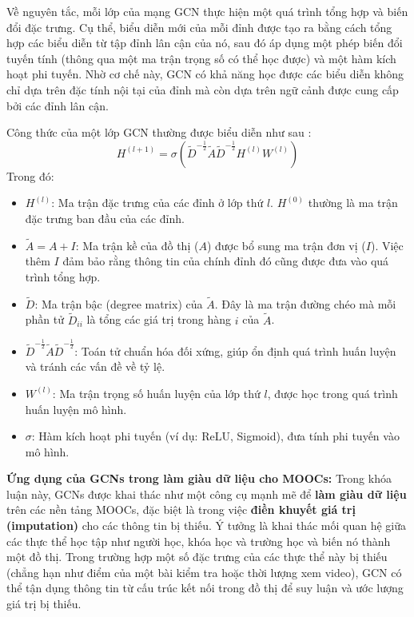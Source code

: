 Về nguyên tắc, mỗi lớp của mạng GCN thực hiện một quá trình tổng hợp và biến đổi đặc trưng. Cụ thể, biểu diễn mới của mỗi đỉnh được tạo ra bằng cách tổng hợp các biểu diễn từ tập đỉnh lân cận của nó, sau đó áp dụng một phép biến đổi tuyến tính (thông qua một ma trận trọng số có thể học được) và một hàm kích hoạt phi tuyến. Nhờ cơ chế này, GCN có khả năng học được các biểu diễn không chỉ dựa trên đặc tính nội tại của đỉnh mà còn dựa trên ngữ cảnh được cung cấp bởi các đỉnh lân cận.


Công thức của một lớp GCN thường được biểu diễn như sau \cite{berg2017graph}:
$$H^{(l+1)} = \sigma(\tilde{D}^{-\frac{1}{2}}\tilde{A}\tilde{D}^{-\frac{1}{2}}H^{(l)}W^{(l)})$$
Trong đó:
\begin{itemize}
    \item $H^{(l)}$: Ma trận đặc trưng của các đỉnh ở lớp thứ $l$. $H^{(0)}$ thường là ma trận đặc trưng ban đầu của các đỉnh.
    \item $\tilde{A} = A + I$: Ma trận kề của đồ thị ($A$) được bổ sung ma trận đơn vị ($I$). Việc thêm $I$ đảm bảo rằng thông tin của chính đỉnh đó cũng được đưa vào quá trình tổng hợp.
    \item $\tilde{D}$: Ma trận bậc (degree matrix) của $\tilde{A}$. Đây là ma trận đường chéo mà mỗi phần tử $\tilde{D}_{ii}$ là tổng các giá trị trong hàng $i$ của $\tilde{A}$.
    \item $\tilde{D}^{-\frac{1}{2}}\tilde{A}\tilde{D}^{-\frac{1}{2}}$: Toán tử chuẩn hóa đối xứng, giúp ổn định quá trình huấn luyện và tránh các vấn đề về tỷ lệ.
    \item $W^{(l)}$: Ma trận trọng số huấn luyện của lớp thứ $l$, được học trong quá trình huấn luyện mô hình.
    \item $\sigma$: Hàm kích hoạt phi tuyến (ví dụ: ReLU, Sigmoid), đưa tính phi tuyến vào mô hình.
\end{itemize}

\textbf{Ứng dụng của GCNs trong làm giàu dữ liệu cho MOOCs:}
Trong khóa luận này, GCNs được khai thác như một công cụ mạnh mẽ để \textbf{làm giàu dữ liệu} trên các nền tảng MOOCs, đặc biệt là trong việc \textbf{điền khuyết giá trị (imputation)} cho các thông tin bị thiếu. Ý tưởng là khai thác mối quan hệ giữa các thực thể học tập như người học, khóa học và trường học và biến nó thành một đồ thị. Trong trường hợp một số đặc trưng của các thực thể này bị thiếu (chẳng hạn như điểm của một bài kiểm tra hoặc thời lượng xem video), GCN có thể tận dụng thông tin từ cấu trúc kết nối trong đồ thị để suy luận và ước lượng giá trị bị thiếu.

